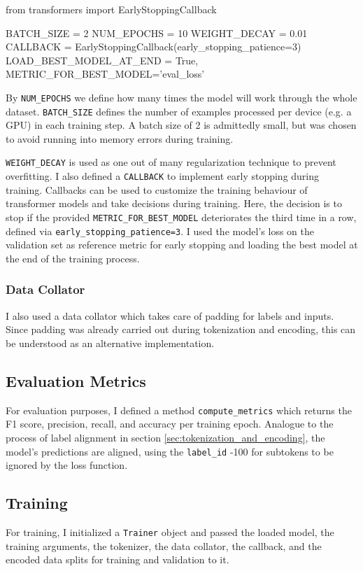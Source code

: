 \begin{minipage}{\linewidth}
\begin{python}
from transformers import EarlyStoppingCallback

BATCH_SIZE = 2
NUM_EPOCHS = 10
WEIGHT_DECAY = 0.01
CALLBACK = EarlyStoppingCallback(early_stopping_patience=3)
LOAD_BEST_MODEL_AT_END = True,
METRIC_FOR_BEST_MODEL='eval_loss'
\end{python}
\end{minipage}

By \verb|NUM_EPOCHS| we define how many times the model will work through the whole dataset. \verb|BATCH_SIZE| defines the number of examples processed per device (e.g. a GPU) in each training step. A batch size of 2 is admittedly small, but was chosen to avoid running into memory errors during training.  

\verb|WEIGHT_DECAY| is used as one out of many regularization technique to prevent overfitting. I also defined a \verb|CALLBACK| to implement early stopping during training. Callbacks can be used to customize the training behaviour of transformer models and take decisions during training. Here, the decision is to stop if the provided \verb|METRIC_FOR_BEST_MODEL| deteriorates the third time in a row, defined via \verb|early_stopping_patience=3|. I used the model's loss on the validation set as reference metric for early stopping and loading the best model at the end of the training process. 

\subsubsection{Data Collator}
I also used a data collator which takes care of padding for labels and inputs. Since padding was already carried out during tokenization and encoding, this can be understood as an alternative implementation.

\subsection{Evaluation Metrics} 
For evaluation purposes, I defined a method \verb|compute_metrics| which returns the F1 score, precision, recall, and accuracy per training epoch. Analogue to the process of label alignment in section \ref{sec:tokenization_and_encoding}, the model's predictions are aligned, using the \verb|label_id| -100 for subtokens to be ignored by the loss function. 

\subsection{Training}
For training, I initialized a \verb|Trainer| object and passed the loaded model, the training arguments, the tokenizer, the data collator, the callback, and the encoded data splits for training and validation to it. 

